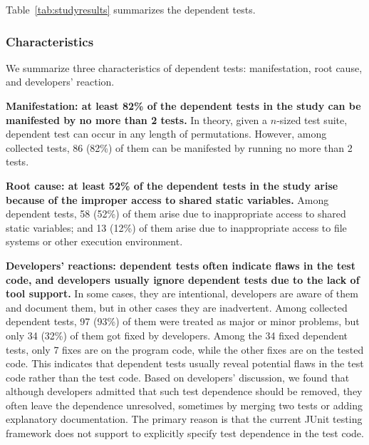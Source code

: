 

Table~\ref{tab:studyresults} summarizes the dependent tests.


\subsubsection{Characteristics}

We summarize three characteristics of dependent tests:
manifestation, root cause, and developers' reaction.

\vspace{1mm}
\noindent \textbf{{Manifestation: at least 82\% of the dependent
tests in the study can be manifested by no more than 2 tests.}} In theory,
given a $n$-sized test suite, dependent test can occur in any
length of permutations. However, among \dtnum collected tests,
86 (82\%) of them can be manifested by running no more than
2 tests. 

\vspace{1mm}
\noindent \textbf{{Root cause: at least 52\% of the dependent tests
in the study arise because of the improper access to shared static
variables.}} Among \dtnum dependent tests, 58 (52\%) of them
arise due to inappropriate access to
shared static variables; and 13 (12\%) of them arise
due to inappropriate access to file systems or other
execution environment. 

\vspace{1mm}
\noindent \textbf{{Developers' reactions: dependent tests
often indicate flaws in the test code, and developers usually
ignore dependent tests due to the lack of tool support.}}
In some cases, they are intentional, developers are aware
of them and document them, but in other cases they are
inadvertent. Among \dtnum collected dependent tests,
97 (93\%) of them were treated as major or minor problems,
but only 34 (32\%) of them got fixed by developers. Among
the 34 fixed dependent tests, only 7 fixes are
on the program code, while the other fixes are on the
tested code. This indicates that dependent tests usually
reveal potential flaws in the test code rather than the test code.
Based on developers' discussion, we found that although
developers admitted that such test dependence should be removed,
they often leave the dependence unresolved, sometimes by merging
two tests or adding explanatory documentation. The primary
reason is that the current JUnit testing framework does not
support to explicitly specify test dependence in the test code.





